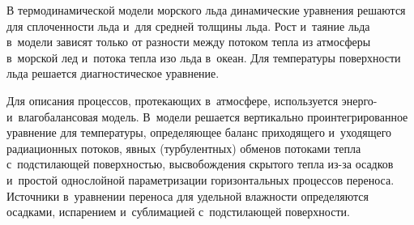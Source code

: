 \begin{multicols}{2}
  В термодинамической модели морского льда динамические уравнения 
решаются для сплоченности льда и~для средней толщины льда. Рост и~таяние 
льда в~модели зависят только от разности между потоком тепла из атмосферы 
в~морской лед и~потока тепла изо льда в~океан. Для температуры по\-верх\-ности 
льда решается диагностическое урав\-нение.
{

} 
  
  Для описания процессов, протекающих в~атмосфере, используется энерго- 
и~влагобалансовая модель. В~модели решается вертикально 
проинтегрированное уравнение для температуры, определяющее баланс 
приходящего и~уходящего радиационных потоков, явных (турбулентных) 
обменов потоками тепла с~подстилающей по\-верх\-ностью, высвобождения 
скрытого тепла из-за осадков и~прос\-той однослойной параметризации 
горизонтальных процессов переноса. Источники в~уравнении переноса для 
удельной влажности определяются осадками, испарением и~сублимацией 
с~подстилающей поверхности.

\begin{table*}[b]\small
\begin{center}


\end{center}
\end{table*}
\end{multicols}
